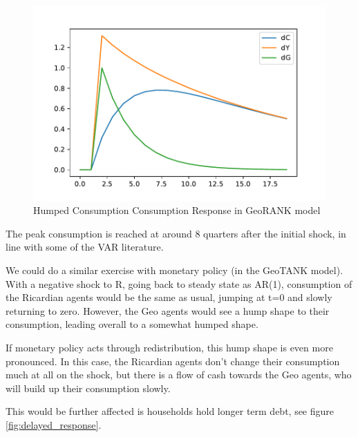 \documentclass{article}
\begin{document}
\begin{figure} 
	\begin{centering}
		\includegraphics[scale=0.6]{../../Python/DoloCode/GeoTANK/Figures/GeoRANK_rho07_irf.pdf}		
		\caption{Humped Consumption Consumption Response in GeoRANK model}
		\label{fig:hump_fiscal}
	\end{centering}
\end{figure}

The peak consumption is reached at around 8 quarters after the initial shock, in line with some of the VAR literature.

We could do a similar exercise with monetary policy (in the GeoTANK model). With a negative shock to R, going back to steady state as AR(1), consumption of the Ricardian agents would be the same as usual, jumping at t=0 and slowly returning to zero. However, the Geo agents would see a hump shape to their consumption, leading overall to a somewhat humped shape.

If monetary policy acts through redistribution, this hump shape is even more pronounced. In this case, the Ricardian agents don't change their consumption much at all on the shock, but there is a flow of cash towards the Geo agents, who will build up their consumption slowly.

This would be further affected is households hold longer term debt, see figure \ref{fig:delayed_response}.
\end{document}
